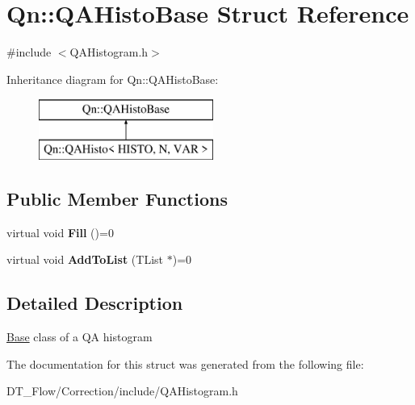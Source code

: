 \hypertarget{structQn_1_1QAHistoBase}{}\section{Qn\+:\+:Q\+A\+Histo\+Base Struct Reference}
\label{structQn_1_1QAHistoBase}


{\ttfamily \#include $<$Q\+A\+Histogram.\+h$>$}

Inheritance diagram for Qn\+:\+:Q\+A\+Histo\+Base\+:\begin{figure}[H]
\begin{center}
\leavevmode
\includegraphics[height=2.000000cm]{structQn_1_1QAHistoBase}
\end{center}
\end{figure}
\subsection*{Public Member Functions}
\begin{DoxyCompactItemize}
\item 
\mbox{\label{structQn_1_1QAHistoBase_aaa08c6aaf1756d3ff1131991bd49e655}} 
virtual void {\bfseries Fill} ()=0
\item 
\mbox{\label{structQn_1_1QAHistoBase_a75180c45e0016b36c993af7677aaab12}} 
virtual void {\bfseries Add\+To\+List} (T\+List $\ast$)=0
\end{DoxyCompactItemize}


\subsection{Detailed Description}
\mbox{\hyperlink{classBase}{Base}} class of a QA histogram 

The documentation for this struct was generated from the following file\+:\begin{DoxyCompactItemize}
\item 
D\+T\+\_\+\+Flow/\+Correction/include/Q\+A\+Histogram.\+h\end{DoxyCompactItemize}
